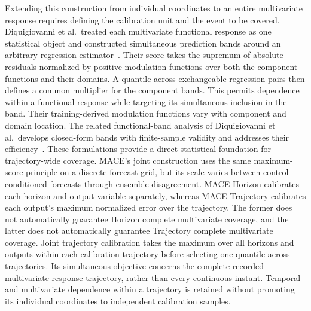Extending this construction from individual coordinates to an entire multivariate response requires defining the calibration unit and the event to be covered. Diquigiovanni et al.\ treated each multivariate functional response as one statistical object and constructed simultaneous prediction bands around an arbitrary regression estimator~\cite{diquigiovanni2022multivariate}. Their score takes the supremum of absolute residuals normalized by positive modulation functions over both the component functions and their domains. A quantile across exchangeable regression pairs then defines a common multiplier for the component bands. This permits dependence within a functional response while targeting its simultaneous inclusion in the band. Their training-derived modulation functions vary with component and domain location. The related functional-band analysis of Diquigiovanni et al.\ develops closed-form bands with finite-sample validity and addresses their efficiency~\cite{diquigiovanni2025bands}. These formulations provide a direct statistical foundation for trajectory-wide coverage. MACE's joint construction uses the same maximum-score principle on a discrete forecast grid, but its scale varies between control-conditioned forecasts through ensemble disagreement. MACE-Horizon calibrates each horizon and output variable separately, whereas MACE-Trajectory calibrates each output's maximum normalized error over the trajectory. The former does not automatically guarantee Horizon complete multivariate coverage, and the latter does not automatically guarantee Trajectory complete multivariate coverage. Joint trajectory calibration takes the maximum over all horizons and outputs within each calibration trajectory before selecting one quantile across trajectories. Its simultaneous objective concerns the complete recorded multivariate response trajectory, rather than every continuous instant. Temporal and multivariate dependence within a trajectory is retained without promoting its individual coordinates to independent calibration samples.


